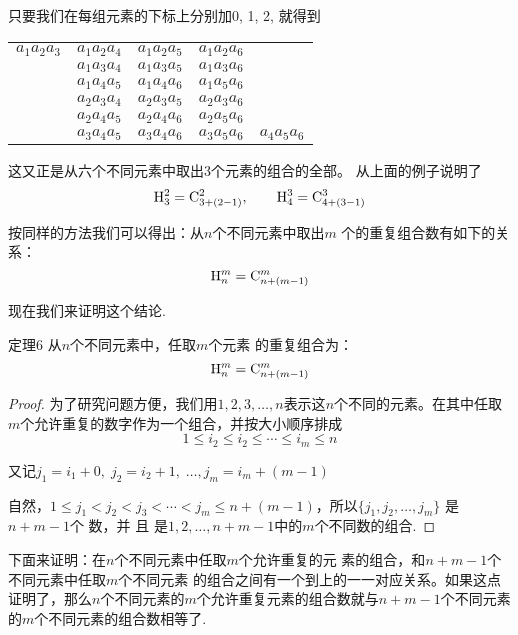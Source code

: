 只要我们在每组元素的下标上分别加0, 1, 2, 就得到
\begin{center}
\begin{tabular}{ccccc}
    $a_{1}a_{2}a_{3}$&$a_{1}a_{2}a_{4}$&$a_{1}a_{2}a_{5}$&$a_{1}a_{2}a_{6}$\\
 & $a_{1}a_{3}a_{4}$&$a_{1}a_{3}a_{5}$&$a_{1}a_{3}a_{6}$\\
 &$a_{1}a_{4}a_{5}$&$a_{1}a_{4}a_{6}$&$a_{1}a_{5}a_{6}$\\
 &$a_{2}a_{3}a_{4}$&$a_{2}a_{3}a_{5}$&$a_{2}a_{3}a_{6}$\\
 &$a_{2}a_{4}a_{5}$&$a_{2}a_{4}a_{6}$&$a_{2}a_{5}a_{6}$\\
 &$a_{3}a_{4}a_{5}$&$a_{3}a_{4}a_{6}$&$a_{3}a_{5}a_{6}$&$a_{4}a_{5}a_{6}$
\end{tabular}
\end{center}

这又正是从六个不同元素中取出3个元素的组合的全部。
从上面的例子说明了
\[{\rm H}_{3}^{2}= {\rm C}_{3+ ( 2- 1) }^{2}, \qquad {\rm H}_{4}^{3}={\rm C}_{4+ ( 3- 1) }^3\]

按同样的方法我们可以得出：从$n$个不同元素中取出$m$
个的重复组合数有如下的关系：
$${\rm H}_{n}^{m}= {\rm C}^m_{n+ ( m- 1) }$$

现在我们来证明这个结论.

\begin{blk}
 {定理6} 从$n$个不同元素中，任取$m$个元素 的重复组合为：
 $${\rm H}_{n}^{m}={\rm C}_{n+ ( m-1) }^{m}$$ 
\end{blk}

\begin{proof}
    为了研究问题方便，我们用$1,2,3,\ldots,n$表示这$n$个不同的元素。在其中任取$m$个允许重复的数字作为一个组合，并按大小顺序排成
$$1\le  i_2\le i_2\le\cdots\le i_m\le n$$

    又记$j_1=i_1+0,\; j_{2}=i_{2}+1,\;\ldots, j_{m}=i_{m}+(m-1)$
    
    自然，$1\le j_1<j_2<j_3<\cdots<j_m\leq n+(m-1)$，所以$\{j_1,j_2,\ldots,j_m\}$ 是$n+ m- 1$个 数，并 且 是$1, 2, \ldots , n+m-1$中的$m$个不同数的组合.
\end{proof}

下面来证明：在$n$个不同元素中任取$m$个允许重复的元
素的组合，和$n+m-1$个不同元素中任取$m$个不同元素 的组合之间有一个到上的一一对应关系。如果这点证明了，那么$n$个不同元素的$m$个允许重复元素的组合数就与$n+m-1$个不同元素的$m$个不同元素的组合数相等了.

